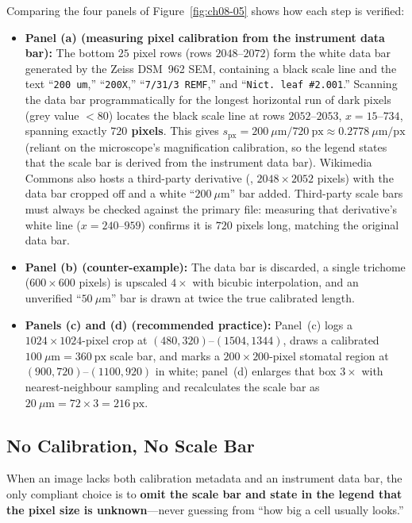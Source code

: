 Comparing the four panels of Figure~\ref{fig:ch08-05} shows how each step is verified:
\begin{itemize}
\item \textbf{Panel (a) (measuring pixel calibration from the instrument data bar):} The bottom $25$ pixel rows (rows $2048\text{--}2072$) form the white data bar generated by the Zeiss DSM~962 SEM, containing a black scale line and the text ``\texttt{200 um},'' ``\texttt{200X},'' ``\texttt{7/31/3 REMF},'' and ``\texttt{Nict.\ leaf \#2.001}.'' Scanning the data bar programmatically for the longest horizontal run of dark pixels (grey value $< 80$) locates the black scale line at rows $2052\text{--}2053$, $x = 15\text{--}734$, spanning exactly \textbf{$720$ pixels}. This gives $s_{\text{px}} = 200\ \mu\text{m} / 720\ \text{px} \approx 0.2778\ \mu\text{m/px}$ (reliant on the microscope's magnification calibration, so the legend states that the scale bar is derived from the instrument data bar). Wikimedia Commons also hosts a third-party derivative (, $2048 \times 2052$ pixels) with the data bar cropped off and a white ``$200\ \mu\text{m}$'' bar added. Third-party scale bars must always be checked against the primary file: measuring that derivative's white line ($x = 240\text{--}959$) confirms it is $720$ pixels long, matching the original data bar.
\item \textbf{Panel (b) (counter-example):} The data bar is discarded, a single trichome ($600 \times 600$ pixels) is upscaled $4\times$ with bicubic interpolation, and an unverified ``$50\ \mu\text{m}$'' bar is drawn at twice the true calibrated length.
\item \textbf{Panels (c) and (d) (recommended practice):} Panel~(c) logs a $1024 \times 1024$-pixel crop at $(480, 320)\text{--}(1504, 1344)$, draws a calibrated $100\ \mu\text{m} = 360\ \text{px}$ scale bar, and marks a $200 \times 200$-pixel stomatal region at $(900, 720)\text{--}(1100, 920)$ in white; panel~(d) enlarges that box $3\times$ with nearest-neighbour sampling and recalculates the scale bar as $20\ \mu\text{m} = 72 \times 3 = 216\ \text{px}$.
\end{itemize}

\subsection{No Calibration, No Scale Bar}

When an image lacks both calibration metadata and an instrument data bar, the only compliant choice is to \textbf{omit the scale bar and state in the legend that the pixel size is unknown}---never guessing from ``how big a cell usually looks.''

